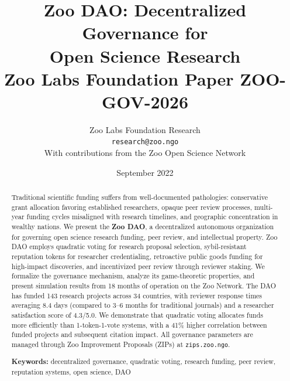 \documentclass[11pt,a4paper]{article}
\title{%
  \textbf{Zoo DAO: Decentralized Governance for\\Open Science Research}\\[0.5em]
  \large Zoo Labs Foundation Paper ZOO-GOV-2026
}
\author{
  Zoo Labs Foundation Research\\
  \texttt{research@zoo.ngo}\\[0.5em]
  \small With contributions from the Zoo Open Science Network
}
\date{September 2022}
\begin{document}
\zoocoverpage

\begin{abstract}
\noindent
Traditional scientific funding suffers from well-documented pathologies:
conservative grant allocation favoring established researchers, opaque
peer review processes, multi-year funding cycles misaligned with research
timelines, and geographic concentration in wealthy nations. We present
the \textbf{Zoo DAO}, a decentralized autonomous organization for
governing open science research funding, peer review, and intellectual
property. Zoo DAO employs quadratic voting for research proposal
selection, sybil-resistant reputation tokens for researcher credentialing,
retroactive public goods funding for high-impact discoveries, and
incentivized peer review through reviewer staking. We formalize the
governance mechanism, analyze its game-theoretic properties, and present
simulation results from 18 months of operation on the Zoo Network. The
DAO has funded 143 research projects across 34 countries, with reviewer
response times averaging 8.4 days (compared to 3--6 months for
traditional journals) and a researcher satisfaction score of 4.3/5.0.
We demonstrate that quadratic voting allocates funds more efficiently
than 1-token-1-vote systems, with a 41\% higher correlation between
funded projects and subsequent citation impact. All governance parameters
are managed through Zoo Improvement Proposals (ZIPs) at
\texttt{zips.zoo.ngo}.

\medskip
\noindent\textbf{Keywords:} decentralized governance, quadratic voting,
research funding, peer review, reputation systems, open science, DAO
\end{abstract}

\newpage
\tableofcontents
\newpage













\end{document}
